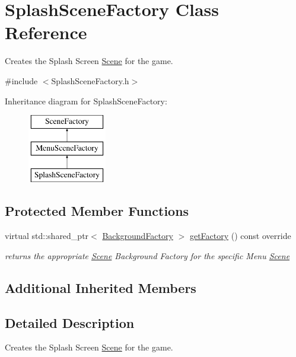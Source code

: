 \hypertarget{class_splash_scene_factory}{}\section{Splash\+Scene\+Factory Class Reference}
\label{class_splash_scene_factory}


Creates the Splash Screen \hyperlink{class_scene}{Scene} for the game.  




{\ttfamily \#include $<$Splash\+Scene\+Factory.\+h$>$}

Inheritance diagram for Splash\+Scene\+Factory\+:\begin{figure}[H]
\begin{center}
\leavevmode
\includegraphics[height=3.000000cm]{d4/ded/class_splash_scene_factory}
\end{center}
\end{figure}
\subsection*{Protected Member Functions}
\begin{DoxyCompactItemize}
\item 
virtual std\+::shared\+\_\+ptr$<$ \hyperlink{class_background_factory}{Background\+Factory} $>$ \hyperlink{class_splash_scene_factory_a08e3da2eb18122670b40c3520462db51}{get\+Factory} () const override
\begin{DoxyCompactList}\small\item\em returns the appropriate \hyperlink{class_scene}{Scene} Background Factory for the specific Menu \hyperlink{class_scene}{Scene} \end{DoxyCompactList}\end{DoxyCompactItemize}
\subsection*{Additional Inherited Members}


\subsection{Detailed Description}
Creates the Splash Screen \hyperlink{class_scene}{Scene} for the game. 

